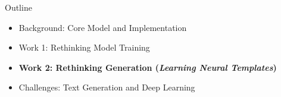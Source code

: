 
\begin{frame}{ Outline}
  \begin{itemize}
  \item Background: Core Model and Implementation
    \air
  \item Work 1: Rethinking Model Training 
    \air

  \item \textbf{Work 2: Rethinking  Generation  (\textit{Learning Neural Templates})}
    \air

  \item Challenges: Text Generation and Deep Learning
  \end{itemize}
\end{frame}







